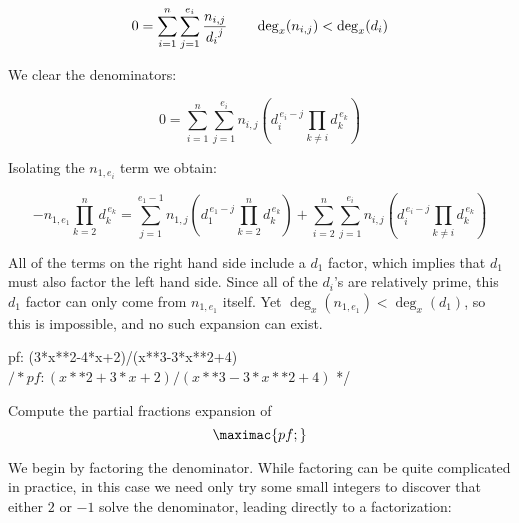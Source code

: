 \begin{equation}
0=\sum_{i=1}^{n}\sum_{j=1}^{e_i} {n_{i,j}\over {d_i}^j}
\qquad \deg_x (n_{i,j}) < \deg_x (d_i)
\end{equation}

We clear the denominators:

\begin{equation}
0 =\sum_{i=1}^{n}\sum_{j=1}^{e_i} n_{i,j} \left( d_i^{\,e_i-j} \prod_{k \ne i} d_k^{\,e_k} \right)
\end{equation}

Isolating the $n_{1,e_i}$ term we obtain:

\begin{equation}
-n_{1,e_1}\prod_{k = 2}^{n} d_{k}^{\,e_k}=\sum_{j=1}^{e_1-1} n_{1,j} \left( d_1^{\,e_1-j} \prod_{k =2}^n d_k^{\,e_k} \right)
+ \sum_{i=2}^{n}\sum_{j=1}^{e_i} n_{i,j} \left( d_i^{\,e_i-j} \prod_{k \ne i} d_k^{\,e_k} \right)
\end{equation}


All of the terms on the right hand side include a $d_1$ factor, which implies that
$d_1$ must also factor the left hand side.
Since all of the $d_i$'s are relatively
prime, this $d_1$ factor can only come from
$n_{1,e_1}$ itself.  Yet
$\deg_x (n_{1,e_1}) < \deg_x (d_1)$, so this is impossible,
and no such expansion can exist.

\endtheorem



\vfill\eject

\example

\begin{maximacode}
pf: (3*x**2-4*x+2)/(x**3-3*x**2+4) $
/* pf: (x**2+3*x+2)/(x**3-3*x**2+4) $ */
\end{maximacode}

Compute the partial fractions expansion of $$\maximac{pf;}$$

We begin by factoring the denominator.  While factoring can be quite
complicated in practice, in this case we need only try some small
integers to discover that either $2$ or $-1$ solve the denominator,
leading directly to a factorization:

